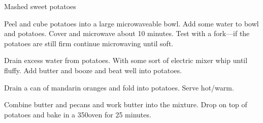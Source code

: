 \begin{recipe}{Mashed sweet potatoes}{}{}


Peel and cube potatoes into a large microwaveable bowl.
Add some water to bowl and potatoes.
Cover and microwave about 10 minutes.
Test with a fork---if the potatoes are still firm continue microwaving until soft.

Drain excess water from potatoes.
With some sort of electric mixer whip until fluffy.
Add butter and booze and beat well into potatoes.

Drain a can of mandarin oranges and fold into potatoes.
Serve hot/warm.

Combine butter and pecans and work butter into the mixture.
Drop on top of potatoes and bake in a 350\degrees oven for 25 minutes.

\end{recipe}